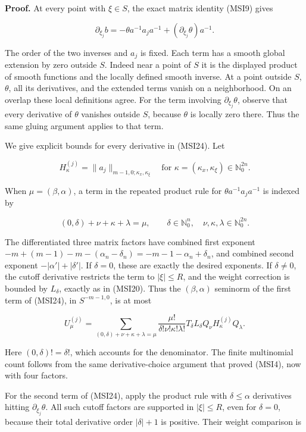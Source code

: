 \documentclass[
  11pt,
]{article}
\begin{document}
\textbf{Proof.} At every point with \(\xi\in S\), the exact matrix
identity (MSI9) gives

\[
\partial_{\xi_j}b
=-\theta a^{-1}a_j a^{-1}
  +(\partial_{\xi_j}\theta)a^{-1}.
\tag{MSI24}
\]

The order of the two inverses and \(a_j\) is fixed. Each term has a
smooth global extension by zero outside \(S\). Indeed near a point of
\(S\) it is the displayed product of smooth functions and the locally
defined smooth inverse. At a point outside \(S\), \(\theta\), all its
derivatives, and the extended terms vanish on a neighborhood. On an
overlap these local definitions agree. For the term involving
\(\partial_{\xi_j}\theta\), observe that every derivative of \(\theta\)
vanishes outside \(S\), because \(\theta\) is locally zero there. Thus
the same gluing argument applies to that term.

We give explicit bounds for every derivative in (MSI24). Let

\[
H^{(j)}_\kappa
=\|a_j\|_{m-1,0;\kappa_x,\kappa_\xi}
\quad
\text{for }\kappa=(\kappa_x,\kappa_\xi)\in\mathbb N_0^{2n}.
\tag{MSI25}
\]

When \(\mu=(\beta,\alpha)\), a term in the repeated product rule for
\(\theta a^{-1}a_j a^{-1}\) is indexed by

\[
(0,\delta)+\nu+\kappa+\lambda=\mu,
\qquad \delta\in\mathbb N_0^n,
\quad \nu,\kappa,\lambda\in\mathbb N_0^{2n}.
\tag{MSI26}
\]

The differentiated three matrix factors have combined first exponent
\(-m+(m-1)-m-(\alpha_n-\delta_n)=-m-1-\alpha_n+\delta_n\), and combined
second exponent \(-|\alpha'|+|\delta'|\). If \(\delta=0\), these are
exactly the desired exponents. If \(\delta\ne0\), the cutoff derivative
restricts the term to \(|\xi|\leq R\), and the weight correction is
bounded by \(L_\delta\), exactly as in (MSI20). Thus the
\((\beta,\alpha)\) seminorm of the first term of (MSI24), in
\(S^{-m-1,0}\), is at most

\[
U_\mu^{(j)}=
\sum_{(0,\delta)+\nu+\kappa+\lambda=\mu}
 \frac{\mu!}{\delta!\nu!\kappa!\lambda!}
 T_\delta L_\delta Q_\nu H^{(j)}_\kappa Q_\lambda.
\tag{MSI27}
\]

Here \((0,\delta)!=\delta!\), which accounts for the denominator. The
finite multinomial count follows from the same derivative-choice
argument that proved (MSI4), now with four factors.

For the second term of (MSI24), apply the product rule with
\(\delta\leq\alpha\) derivatives hitting \(\partial_{\xi_j}\theta\). All
such cutoff factors are supported in \(|\xi|\leq R\), even for
\(\delta=0\), because their total derivative order \(|\delta|+1\) is
positive. Their weight comparison is
\end{document}
